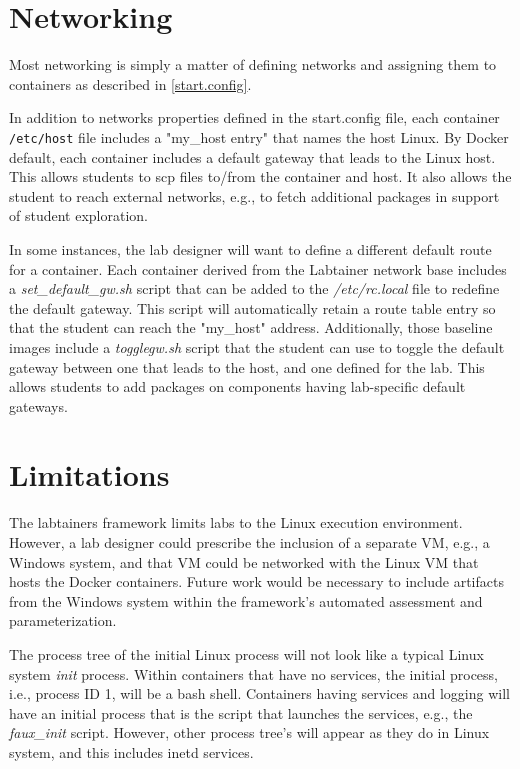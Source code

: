 \documentclass{article}
\begin{document}
\section{Networking}
Most networking is simply a matter of defining networks and assigning them to containers
as described in \ref{start.config}.  

In addition to networks properties defined in the
start.config file, each container \texttt{/etc/host} file includes a "my\_host entry" that names
the host Linux.  By Docker default, each container includes a default gateway that
leads to the Linux host.  This allows students to scp files to/from the container and host.
It also allows the student to reach external networks, e.g., to fetch additional packages in
support of student exploration.

In some instances, the lab designer will want to define a different default route for a 
container.  Each container derived from the Labtainer network base includes a \textit{set\_default\_gw.sh}
script that can be added to the \textit{/etc/rc.local} file to redefine the default gateway.
This script will automatically retain a route table entry so that the student can reach the "my\_host"
address.  Additionally, those baseline images include a \textit{togglegw.sh} script that the student
can use to toggle the default gateway between one that leads to the host, and one defined for the lab.
This allows students to add packages on components having lab-specific default gateways.

\section{Limitations}
The labtainers framework limits labs to the Linux execution environment.
However, a lab designer could prescribe the inclusion of a separate
VM, e.g., a Windows system, and that VM could be networked with the Linux
VM that hosts the Docker containers.  Future work would be necessary to include
artifacts from the Windows system within the framework's automated assessment
and parameterization.

The process tree of the initial Linux process will
not look like a typical Linux system \textit{init} process.  Within containers that have no
services, the initial process, i.e., process ID 1, will be a bash shell.
Containers having services and logging will have an initial process that is
the script that launches the services, e.g., the \textit{faux\_init} script.  However,
other process tree's will appear as they
do in Linux system, and this includes inetd services.
\end{document}
